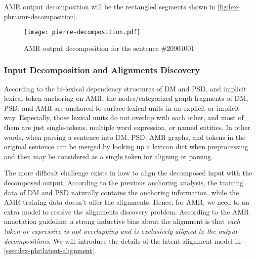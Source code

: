 AMR output decomposition will be the rectangled segments shown in
\autoref{fig:lex-phr:amr-decomposition}.
\begin{figure}[!th]
  \centering
  \texttt{[image: pierre-decomposition.pdf]}
  \caption{\label{fig:lex-phr:amr-decomposition} AMR output
    decomposition for the sentence \#20001001}
\end{figure}

\subsubsection{Input Decomposition and Alignments Discovery}
\label{sssec:lex-phr:lex-input-decomposition}

According to the bi-lexical dependency structures of DM and PSD, and
implicit lexical token anchoring on AMR, the nodes/categorized graph
fragments of DM, PSD, and AMR are anchored to surface lexical units in
an explicit or implicit way. Especially, those lexical units do not
overlap with each other, and most of them are just single-tokens,
multiple word expression, or named entities. In other words, when
parsing a sentence into DM, PSD, AMR graphs, and tokens in the original
sentence can be merged by looking up a lexicon dict when preprocessing
and then may be considered as a single token for aligning or parsing.

The more difficult challenge exists in how to align the decomposed
input with the decomposed output. According to the previous anchoring
analysis, the training data of DM and PSD naturally contains the
anchoring information, while the AMR training data doesn't offer the
alignments. Hence, for AMR, we need to an extra model to resolve the
alignments discovery problem. According to the AMR annotation
guideline, a strong inductive bias about the alignment is that
\textit{each token or expressive is not overlapping and is
  exclusively aligned to the output decompositions.} We will
introduce the details of the latent alignment model in
\autoref{ssec:lex-phr:latent-alignment}.

